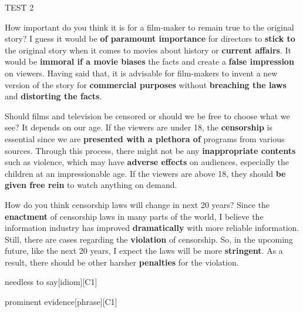 \documentclass[a4paper,12pt]{article}
\begin{document}
\begin{glossarymc}[Cambridge 3]
\begin{test}{TEST 2}
\begin{qa}{How important do you think it is for a film-maker to remain true to the original story?}
I guess it would be \textbf{of paramount importance} for directors to \textbf{stick to} the original story when it comes to movies about history or \textbf{current affairs}. It would be \textbf{immoral if a movie biases} the facts and create a \textbf{false impression} on viewers. Having said that, it is advisable for film-makers to invent a new version of the story for \textbf{commercial purposes} without \textbf{breaching the laws} and \textbf{distorting the facts}.
\end{qa}

\begin{qa}{Should films and television be censored or should we be free to choose what we see?}
It depends on our age. If the viewers are under 18, the \textbf{censorship} is essential since we are \textbf{presented with a plethora of} programs from various sources. Through this process, there might not be any \textbf{inappropriate contents} such as violence, which may have \textbf{adverse effects} on audiences, especially the children at an impressionable age. If the viewers are above 18, they should \textbf{be given free rein} to watch anything on demand.
\end{qa}

\begin{qa}{How do you think censorship laws will change in next 20 years?}
Since the \textbf{enactment} of censorship laws in many parts of the world, I believe the information industry has improved \textbf{dramatically} with more reliable information. Still, there are cases regarding the \textbf{violation} of censorship. So, in the upcoming future, like the next 20 years, I expect the laws will be more \textbf{stringent}. As a result, there should be other harsher \textbf{penalties} for the violation.
\end{qa}

\begin{VocabExplain}[Part 3]
    \begin{ExplainCard}{needless to say}[idiom][C1]
\end{ExplainCard}

\begin{ExplainCard}{prominent evidence}[phrase][C1]
\end{ExplainCard}


\end{VocabExplain}
\end{test}
\end{glossarymc}
\end{document}
